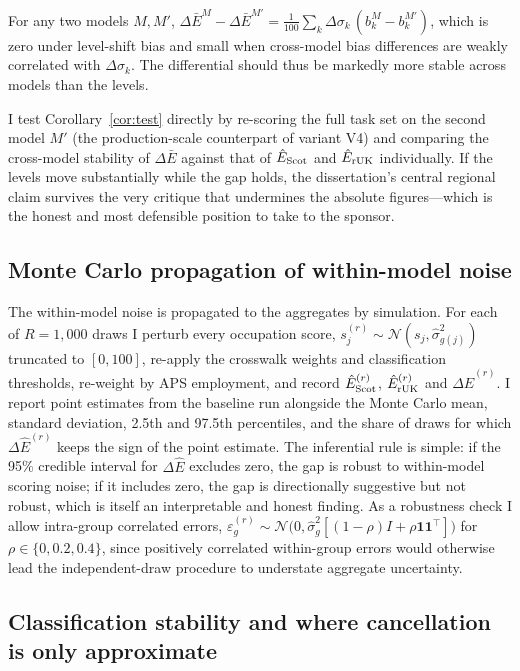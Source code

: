 \begin{corollary}\label{cor:test}
For any two models $M,M'$, $\Delta\bar E^{M}-\Delta\bar E^{M'}=\tfrac{1}{100}\sum_k\Delta\sigma_k\,(b^{M}_k-b^{M'}_k)$, which is zero under level-shift bias and small when cross-model bias differences are weakly correlated with $\Delta\sigma_k$. The differential should thus be markedly more stable across models than the levels.
\end{corollary}

I test Corollary~\ref{cor:test} directly by re-scoring the full task set on the second model $M'$ (the production-scale counterpart of variant V4) and comparing the cross-model stability of $\Delta\bar E$ against that of $\hat E_{\mathrm{Scot}}$ and $\hat E_{\mathrm{rUK}}$ individually. If the levels move substantially while the gap holds, the dissertation's central regional claim survives the very critique that undermines the absolute figures---which is the honest and most defensible position to take to the sponsor.

\subsection{Monte Carlo propagation of within-model noise}

The within-model noise is propagated to the aggregates by simulation. For each of $R=1{,}000$ draws I perturb every occupation score, $s^{(r)}_j\sim\mathcal{N}(s_j,\hat\sigma^2_{g(j)})$ truncated to $[0,100]$, re-apply the crosswalk weights and classification thresholds, re-weight by APS employment, and record $\hat E^{(r)}_{\mathrm{Scot}}$, $\hat E^{(r)}_{\mathrm{rUK}}$ and $\Delta\hat E^{(r)}$. I report point estimates from the baseline run alongside the Monte Carlo mean, standard deviation, 2.5th and 97.5th percentiles, and the share of draws for which $\Delta\hat E^{(r)}$ keeps the sign of the point estimate. The inferential rule is simple: if the 95\% credible interval for $\Delta\hat E$ excludes zero, the gap is robust to within-model scoring noise; if it includes zero, the gap is directionally suggestive but not robust, which is itself an interpretable and honest finding. As a robustness check I allow intra-group correlated errors, $\varepsilon^{(r)}_g\sim\mathcal{N}\big(0,\hat\sigma^2_g[(1-\rho)I+\rho\mathbf{1}\mathbf{1}^{\top}]\big)$ for $\rho\in\{0,0.2,0.4\}$, since positively correlated within-group errors would otherwise lead the independent-draw procedure to understate aggregate uncertainty.

\subsection{Classification stability and where cancellation is only approximate}

